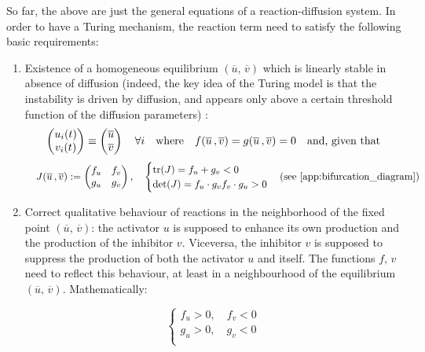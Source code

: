 So far, the above are just the general equations of a reaction-diffusion system. In order to have a Turing mechanism, the reaction term need to satisfy the following basic requirements:
\begin{enumerate}
	\item Existence of a homogeneous equilibrium $(\overline{u},\, \overline{v})$ which is linearly stable in absence of diffusion (indeed, the key idea of the Turing model is that the instability is driven by diffusion, and appears only above a certain threshold function of the diffusion parameters) :
		$$
		\centering
		\begin{pmatrix}
			u_i(t) \\
			v_i(t)
		\end{pmatrix} \equiv  
		\begin{pmatrix}
			\overline{u} \\
			\overline{v}
		\end{pmatrix}
        \quad \forall i 
		\quad \text{where} \quad f(\overline{u}\,, \overline{v}) = g(\overline{u}\,, \overline{v})=0 \quad \text{and, given that}
		$$
		$$
		 \quad J(\overline{u}\,, \overline{v}) := 
		\begin{pmatrix}
 			f_u & f_v \\
 			g_u & g_v
 		\end{pmatrix}, \quad
 		\begin{cases}
 			\text{tr}(J)= f_u + g_v < 0\\
 			\text{det}(J) = f_u\cdot g_v f_v\cdot g_u>0
 		\end{cases}
		\text{(see \ref{app:bifurcation_diagram})}
		$$
	\item Correct qualitative behaviour of reactions in the neighborhood of the fixed point $(\overline{u},\, \overline{v})$: \newline
    the activator $u$ is supposed to enhance its own production and the production of the inhibitor $v$. Viceversa, the inhibitor $v$ is supposed to suppress the production of both the activator $u$ and itself. The functions $f,\, v$ need to reflect this behaviour, at least in a neighbourhood of the equilibrium $(\overline{u},\, \overline{v})$. Mathematically:
    \begin{center}
    \begin{minipage}{0.4\textwidth}
    \centering
    $$
           \begin{cases}
         f_u > 0,\quad f_v < 0 \\
         g_u >0,\quad  g_v <0 \\      

\end{cases}$$
\end{minipage}
\end{center}
\end{enumerate}

